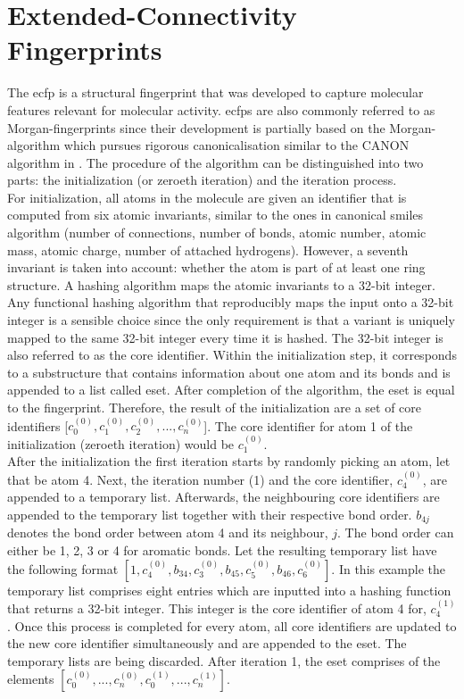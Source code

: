 \section{Extended-Connectivity Fingerprints}\label{sec:extendedconnectivityfingerprints}
The \ac{ecfp} is a structural fingerprint that was developed to capture molecular features relevant for molecular activity.\cite{Rogers2010} \acp{ecfp} are also commonly referred to as Morgan-fingerprints since their development is partially based on the Morgan-algorithm which pursues rigorous canonicalisation similar to the CANON algorithm in .\cite{Morgan1965} 
The procedure of the algorithm can be distinguished into two parts: the initialization (or zeroeth iteration) and the iteration process.\\
For initialization, all atoms in the molecule are given an identifier that is computed from six atomic invariants, similar to the ones in  canonical \ac{smiles} algorithm (number of connections, number of bonds, atomic number, atomic mass, atomic charge, number of attached hydrogens).\cite{smilesmanual} However, a seventh invariant is taken into account: whether the atom is part of at least one ring structure. A hashing algorithm maps the atomic invariants to a 32-bit integer. Any functional hashing algorithm that reproducibly maps the input onto a 32-bit integer is a sensible choice since the only requirement is that a variant is uniquely mapped to the same 32-bit integer every time it is hashed. The 32-bit integer is also referred to as the core identifier. Within the initialization step, it corresponds to a substructure that contains information about one atom and its bonds and is appended to a list called \acl{eset}. After completion of the algorithm, the \acl{eset} is equal to the fingerprint.\cite{Rogers2010} Therefore, the result of the initialization are a set of core identifiers [$c^{(0)}_0,c^{(0)}_1,c^{(0)}_2,...,c^{(0)}_n$]. The core identifier for atom 1 of the initialization (zeroeth iteration) would be $c^{(0)}_1$.\\
After the initialization the first iteration starts by randomly picking an atom, let that be atom 4. Next, the iteration number (1) and the core identifier, $c^{(0)}_4$, are appended to a temporary list. Afterwards, the neighbouring core identifiers are appended to the temporary list together with their respective bond order. $b_{4j}$ denotes the bond order between atom 4 and its neighbour, $j$. The bond order can either be 1, 2, 3 or 4 for aromatic bonds. Let the resulting temporary list have the following format $[1,c^{(0)}_4,b_{34},c^{(0)}_3,b_{45},c^{(0)}_5,b_{46},c^{(0)}_6]$. In this example the temporary list comprises eight entries which are inputted into a hashing function that returns a 32-bit integer. This integer is the core identifier of atom 4 for, $c^{(1)}_4$. Once this process is completed for every atom, all core identifiers are updated to the new core identifier simultaneously and are appended to the \acl{eset}. The temporary lists are being discarded. After iteration 1, the \acl{eset} comprises of the elements $[c^{(0)}_0,...,c^{(0)}_n,c^{(1)}_0,...,c^{(1)}_n]$.\cite{Rogers2010}\\
